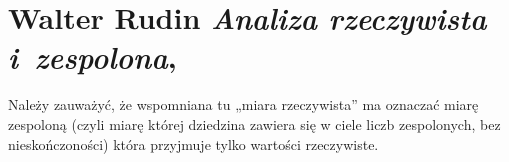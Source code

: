 \documentclass[a4paper,11pt]{article}
\numberwithin{equation}{section}
\begin{document}






\newpage

\section{Walter Rudin \textit{Analiza rzeczywista
    i~zespolona},
  \parencite{Rudin-Analiza-rzeczywista-i-zespolona-Pub-1998}}

\vspace{0em}



\vspace{0em}


\noindent
{} Należy zauważyć, że wspomniana tu „miara rzeczywista” ma oznaczać
miarę zespoloną (czyli miarę której dziedzina zawiera się w ciele liczb
zespolonych, bez nieskończoności) która przyjmuje tylko wartości
rzeczywiste.





\newpage

\end{document}
